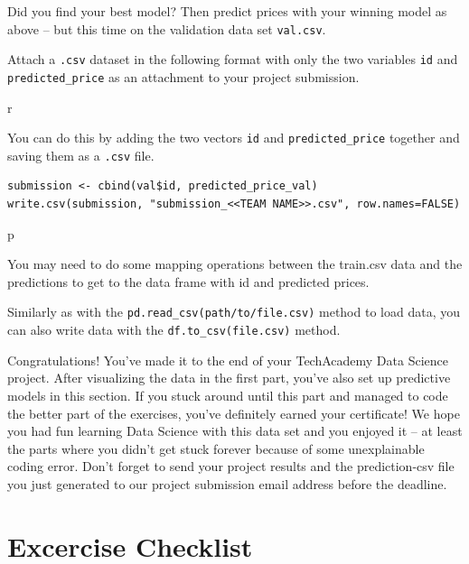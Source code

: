 \documentclass[
  11pt,
]{book}
\begin{document}
Did you find your best model? Then predict prices with your winning
model as above -- but this time on the validation data set
\texttt{val.csv}.

Attach a \texttt{.csv} dataset in the following format with only the two
variables \texttt{id} and \texttt{predicted\_price} as an attachment to
your project submission.

\begin{tips}r

You can do this by adding the two vectors \texttt{id} and
\texttt{predicted\_price} together and saving them as a \texttt{.csv}
file.

\begin{verbatim}
submission <- cbind(val$id, predicted_price_val)
write.csv(submission, "submission_<<TEAM NAME>>.csv", row.names=FALSE)
\end{verbatim}

\end{tips}

\begin{tipsp}p

You may need to do some mapping operations between the train.csv data
and the predictions to get to the data frame with id and predicted
prices.

Similarly as with the \texttt{pd.read\_csv(path/to/file.csv)} method to
load data, you can also write data with the
\texttt{df.to\_csv(file.csv)} method.

\end{tipsp}

Congratulations! You've made it to the end of your TechAcademy Data
Science project. After visualizing the data in the first part, you've
also set up predictive models in this section. If you stuck around until
this part and managed to code the better part of the exercises, you've
definitely earned your certificate! We hope you had fun learning Data
Science with this data set and you enjoyed it -- at least the parts
where you didn't get stuck forever because of some unexplainable coding
error. Don't forget to send your project results and the prediction-csv
file you just generated to our project submission email address before
the deadline.

\newpage

\hypertarget{excercise-checklist}{%
\chapter{Excercise Checklist}\label{excercise-checklist}}
\end{document}
